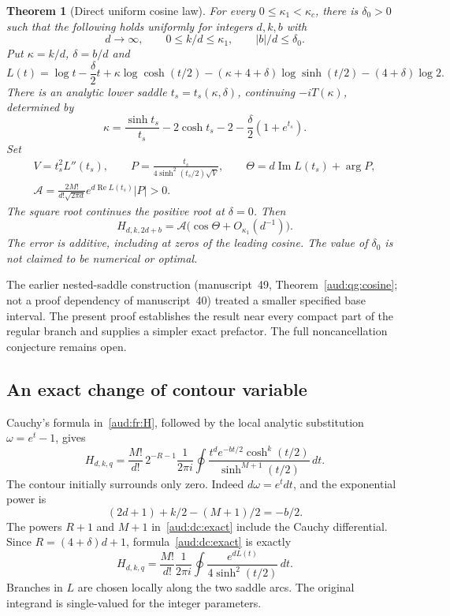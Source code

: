 \documentclass[11pt,a4paper]{article}
\numberwithin{equation}{section}
\newtheorem{theorem}{Theorem}[section]
\begin{document}
\begin{theorem}[Direct uniform cosine law]\label{aud:dc:main}
For every $0\le\kappa_1<\kappa_c$, there is $\delta_0>0$ such that the following holds uniformly for integers $d,k,b$ with
\[
 d\longrightarrow\infty,\qquad 0\le k/d\le\kappa_1,\qquad |b|/d\le\delta_0.
\]
Put $\kappa=k/d$, $\delta=b/d$ and
\begin{equation}\label{aud:dc:L}
 L(t)=\log t-\frac\delta2t+\kappa\log\cosh(t/2)
 -(\kappa+4+\delta)\log\sinh(t/2)-(4+\delta)\log2.
\end{equation}
There is an analytic lower saddle $t_s=t_s(\kappa,\delta)$, continuing $-iT(\kappa)$, determined by
\begin{equation}\label{aud:dc:saddle}
 \kappa=\frac{\sinh t_s}{t_s}-2\cosh t_s-2
                       -\frac\delta2(1+e^{t_s}).
\end{equation}
Set
\begin{gather}
 V=t_s^2L''(t_s),\qquad
 P=\frac{t_s}{4\sinh^2(t_s/2)\sqrt V},\qquad
 \Theta=d\operatorname{Im}L(t_s)+\arg P,\label{aud:dc:prefactor}\\
 \mathcal A=\frac{2M!}{d!\sqrt{2\pi d}}
                    e^{d\operatorname{Re}L(t_s)}|P|>0.
\end{gather}
The square root continues the positive root at $\delta=0$. Then
\begin{equation}\label{aud:dc:cosine}
 H_{d,k,2d+b}=\mathcal A\bigl(\cos\Theta+O_{\kappa_1}(d^{-1})\bigr).
\end{equation}
The error is additive, including at zeros of the leading cosine. The value of $\delta_0$ is not claimed to be numerical or optimal.
\end{theorem}

The earlier nested-saddle construction (manuscript~49, Theorem~\ref{aud:qg:cosine}; not a proof dependency of manuscript~40) treated a smaller specified base interval. The present proof establishes the result near every compact part of the regular branch and supplies a simpler exact prefactor. The full noncancellation conjecture remains open.
\subsection{An exact change of contour variable}
Cauchy's formula in~\eqref{aud:fr:H}, followed by the local analytic substitution $\omega=e^t-1$, gives
\begin{equation}\label{aud:dc:exact}
 H_{d,k,q}=\frac{M!}{d!}\,2^{-R-1}\frac1{2\pi i}
 \oint\frac{t^d e^{-bt/2}\cosh^k(t/2)}{\sinh^{M+1}(t/2)}\,dt.
\end{equation}
The contour initially surrounds only zero. Indeed $d\omega=e^t dt$, and the exponential power is
\[
 (2d+1)+k/2-(M+1)/2=-b/2.
\]
The powers $R+1$ and $M+1$ in~\eqref{aud:dc:exact} include the Cauchy differential. Since $R=(4+\delta)d+1$, formula~\eqref{aud:dc:exact} is exactly
\begin{equation}\label{aud:dc:actionintegral}
 H_{d,k,q}=\frac{M!}{d!}\frac1{2\pi i}
           \oint\frac{e^{dL(t)}}{4\sinh^2(t/2)}\,dt.
\end{equation}
Branches in $L$ are chosen locally along the two saddle arcs. The original integrand is single-valued for the integer parameters.
\end{document}
